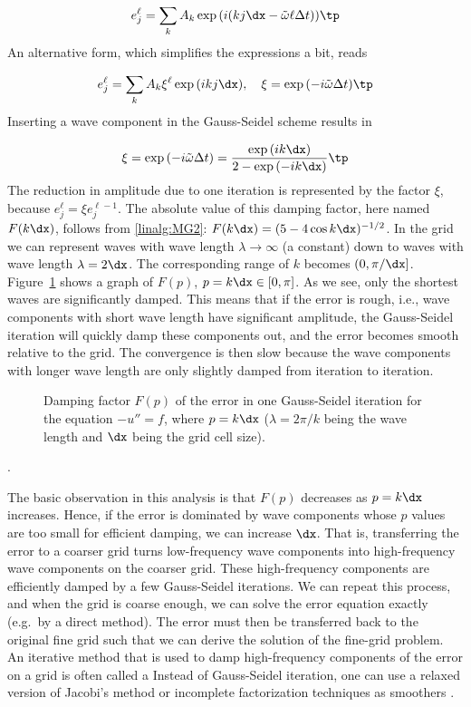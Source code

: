\[ e_j^\ell = \sum_k A_k\exp{(i(kj\dx - \tilde\omega\ell\Delta t ))}\tp \]
An alternative form, which  simplifies the expressions a bit, reads

\[ e_j^\ell = \sum_k A_k\xi^\ell\exp{(ikj\dx )},\quad \xi =
\exp{(-i\tilde\omega\Delta t )}\tp \]
Inserting a wave component in the Gauss-Seidel scheme results in

\begin{equation}
\xi = \exp{(-i\tilde\omega\Delta t)} = {\exp{(ik\dx )}\over
2 - \exp{(-ik\dx )}} \tp
\label{linalg:MG2}
\end{equation}
The reduction in amplitude due to one iteration is represented by
the factor $\xi$, because
$e_j^{\ell} = \xi e_j^{\ell -1}$.
 The absolute value of this
damping factor, here named $F(k\dx )$, follows from
\eqref{linalg:MG2}: $F(k\dx ) =(5-4\cos k\dx )^{-1/2}$.
In the grid we can represent waves with wave
length $\lambda \rightarrow \infty$ (a constant)
down to waves with wave length $\lambda = 2\dx$. The corresponding
range of $k$ becomes $(0,\pi /\dx ]$.
Figure~\ref{linalg:MG:fig1} shows a graph of $F(p)$, $p=k\dx\in [0,\pi]$.
As we see, only the shortest waves are significantly damped.
This means that if the error is rough, i.e., wave components with short
wave length have significant amplitude, the Gauss-Seidel
iteration will quickly damp
these components out, and the error becomes smooth relative to the grid.
The convergence is then slow because the wave components with longer
wave length are only slightly damped from iteration to iteration.

\begin{figure}
\centerline{}
\caption{\label{linalg:MG:fig1}
Damping factor $F(p)$ of the error in one Gauss-Seidel iteration for the
equation $-u''=f$, where $p=k\dx$ ($\lambda =2\pi /k$ being the
wave length and $\dx$ being the grid cell size).}
\end{figure}

.

The basic observation in this analysis is that $F(p)$ decreases as
$p=k\dx $ increases. Hence, if the error is dominated by wave components
whose $p$ values are too small for efficient damping,
we can increase $\dx$.
That is, transferring the error to a coarser grid turns low-frequency
wave components into high-frequency wave components on the coarser grid.
These high-frequency components are efficiently damped by a few
Gauss-Seidel iterations.
We can repeat this process, and when the grid is coarse enough, we can
solve the error equation exactly (e.g.~by a direct method).
The error must then be transferred back to the original fine grid
such that we can derive the solution of the fine-grid problem.
An iterative method that is used to damp high-frequency components of
the error on a grid is often called a
Instead of Gauss-Seidel iteration, one  can use a relaxed version of
Jacobi's method or
incomplete factorization techniques as smoothers \cite{Wesseling92}.

